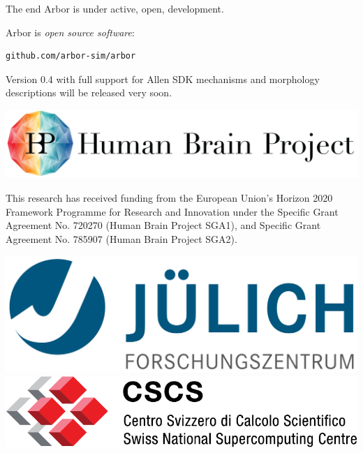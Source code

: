 \documentclass[aspectratio=43]{beamer}
\newcommand{\arbor}{{\ttfamily Arbor}\xspace}
\begin{document}
\begin{frame}[fragile]{The end}
    \arbor is under active, open, development.

    \vspace{10pt}

    \begin{center}
        \arbor is \emph{open source software}:\\
        \vspace{3pt}
        \begin{lstlisting}[style=talkpseudo]
                  github.com/arbor-sim/arbor
        \end{lstlisting}
    \end{center}

    Version 0.4 with full support for Allen SDK mechanisms and morphology descriptions will be released very soon.
\end{frame}

\begin{frame}[fragile]{}
    \begin{center}
        \includegraphics[height=0.15\textwidth]{logos/HBP_logo.jpg}
        \\ \vfill

        This research has received funding from the European Union’s Horizon 2020 Framework Programme for Research
        and Innovation under the Specific Grant Agreement No.  720270 (Human Brain Project SGA1), and Specific Grant
        Agreement No. 785907 (Human Brain Project SGA2).
        \\ \vfill

        \includegraphics[height=0.1\textwidth]{logos/julich_logo.pdf}
        \hspace{1cm}
        \includegraphics[height=0.09\textwidth]{logos/cscs_logo.pdf}
    \end{center}

\end{frame}
\end{document}
